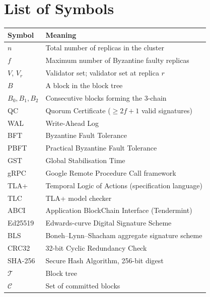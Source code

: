 \documentclass[a4paper,12pt,onecolumn]{report}
\begin{document}





\tableofcontents		%

\listoftables
{}

\listoffigures
{}

\chapter*{List of Symbols}

\begin{tabular}{@{}ll@{}}
\toprule
\textbf{Symbol} & \textbf{Meaning} \\
\midrule
$n$            & Total number of replicas in the cluster \\
$f$            & Maximum number of Byzantine faulty replicas \\
$V$, $V_r$     & Validator set; validator set at replica $r$ \\
$B$            & A block in the block tree \\
$B_0, B_1, B_2$& Consecutive blocks forming the 3-chain \\
QC             & Quorum Certificate ($\ge 2f{+}1$ valid signatures) \\
WAL            & Write-Ahead Log \\
BFT            & Byzantine Fault Tolerance \\
PBFT           & Practical Byzantine Fault Tolerance \\
GST            & Global Stabilisation Time \\
gRPC           & Google Remote Procedure Call framework \\
TLA+           & Temporal Logic of Actions (specification language) \\
TLC            & TLA+ model checker \\
ABCI           & Application BlockChain Interface (Tendermint) \\
Ed25519        & Edwards-curve Digital Signature Scheme \\
BLS            & Boneh--Lynn--Shacham aggregate signature scheme \\
CRC32          & 32-bit Cyclic Redundancy Check \\
SHA-256        & Secure Hash Algorithm, 256-bit digest \\
$\mathcal{T}$  & Block tree \\
$\mathcal{C}$  & Set of committed blocks \\
\bottomrule
\end{tabular}
\end{document}
